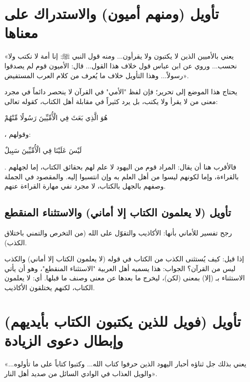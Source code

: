 \separator

\section{تأويل (ومنهم أميون) والاستدراك على معناها}
 «يعني بالأميين الذين لا يكتبون ولا يقرأون... ومنه قول النبي ﷺ: إنا أمة لا نكتب ولا نحسب... وروي عن ابن عباس قول خلاف هذا القول... قال: الأميون قوم لم يصدقوا رسولاً... وهذا التأويل خلاف ما يُعرف من كلام العرب المستفيض».

\begin{fawaid}
يحتاج هذا الموضع إلى تحرير؛ فإن لفظ "الأمي" في القرآن لا ينحصر دائماً في مجرد معنى من لا يقرأ ولا يكتب، بل يرد كثيراً في مقابلة أهل الكتاب، كقوله تعالى: \begin{ayah}هُوَ الَّذِي بَعَثَ فِي الْأُمِّيِّينَ رَسُولًا مِّنْهُمْ\end{ayah}، وقولهم: \begin{ayah}لَيْسَ عَلَيْنَا فِي الْأُمِّيِّينَ سَبِيلٌ\end{ayah}. فالأقرب هنا أن يقال: المراد قوم من اليهود لا علم لهم بحقائق الكتاب، إما لجهلهم بالقراءة، وإما لكونهم ليسوا من أهل العلم به وإن انتسبوا إليه. والمقصود في الجملة وصفهم بالجهل بالكتاب، لا مجرد نفي مهارة القراءة عنهم.
\end{fawaid}

\subsection{تأويل (لا يعلمون الكتاب إلا أماني) والاستثناء المنقطع}
رجح  تفسير  للأماني بأنها: الأكاذيب والتقوّل على الله (من التخرص والتمني باختلاق الكذب).

\begin{fawaid}
إذا قيل: كيف يُستثنى الكذب من الكتاب في قوله (لا يعلمون الكتاب إلا أماني) والكذب ليس من القرآن؟ الجواب: هذا يسميه أهل العربية "الاستثناء المنقطع"، وهو أن يأتي الاستثناء بـ (إلا) بمعنى (لكن)، ليخرج ما بعدها عن معنى وصنف ما قبلها. أي: لا يعلمون الكتاب، لكنهم يختلقون الأكاذيب.
\end{fawaid}

\separator

\section{تأويل (فويل للذين يكتبون الكتاب بأيديهم) وإبطال دعوى الزيادة}
 «يعني بذلك جل ثناؤه أحبار اليهود الذين حرفوا كتاب الله... وكتبوا كتاباً على ما تأولوه... والويل العذاب في الوادي السائل من صديد أهل النار».

